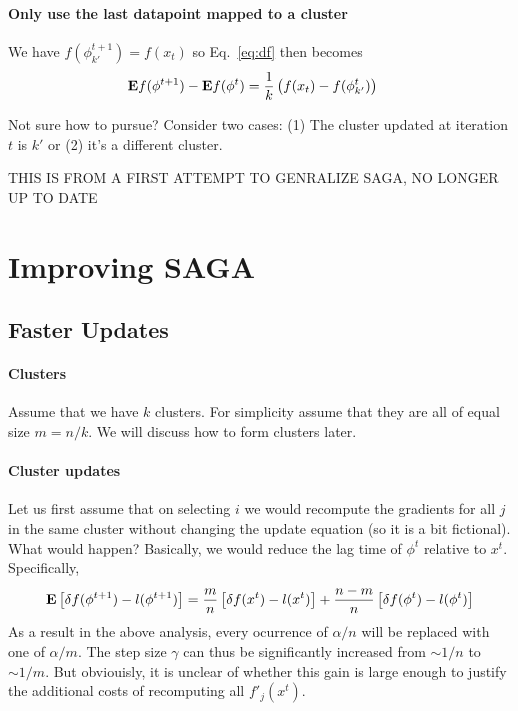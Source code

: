 \documentclass{article}
\newcommand{\E}{{\bf E}}
\begin{document}
\paragraph{Only use the last datapoint mapped to a cluster}

We have $ f(\phi^{t+1}_{k'}) = f(x_t)$ so Eq.~\ref{eq:df} then becomes
\begin{align}
\E f(\phi^{t+1}) - \E f(\phi^t) &= \frac{1}{k} \left(f(x_t) - f(\phi_{k'}^t) \right)
\end{align}

Not sure how to pursue?
Consider two cases: (1) The cluster updated at iteration $t$ is $k'$ or (2) it's a different cluster.


\newpage

THIS IS FROM A FIRST ATTEMPT TO GENRALIZE SAGA, NO LONGER UP TO DATE

\section*{Improving SAGA} 

\subsection*{Faster Updates}

\paragraph*{Clusters} Assume that we have $k$ clusters. For simplicity assume that they are all of equal size $m= n/k$. We will discuss how to form clusters later. 

\paragraph*{Cluster updates} 
Let us first assume that on selecting $i$ we would recompute the gradients for all $j$ in the same cluster without changing the update equation (so it is a bit fictional). What would happen? Basically, we would reduce the lag time of $\phi^t$ relative to $x^t$. Specifically, 
\begin{align}
\E \left[ \delta f(\phi^{t+1}) - l (\phi^{t+1}) \right] 
= 
\frac mn \left[ \delta f(x^t) - l(x^t) \right] +  \frac{n-m}{n} \left[ \delta f(\phi^t) -  l(\phi^t) \right] 
\end{align}
As a result in the above analysis, every ocurrence of $\alpha/n$ will be replaced with one of $\alpha/m$. The step size  $\gamma$ can thus be significantly increased from $\sim 1/n$ to $\sim 1/m$. But obviouisly, it is unclear of whether this gain is large enough to justify the additional costs of recomputing all $f'_j(x^t)$. 
\end{document}
